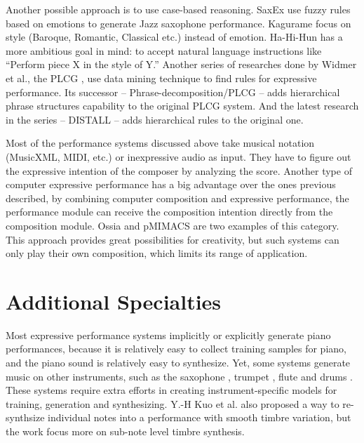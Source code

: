Another possible approach is to use case-based reasoning. SaxEx \cite{40,41,42} use fuzzy rules based on emotions to generate Jazz saxophone performance. Kagurame \cite{43,44} focus on style (Baroque, Romantic, Classical etc.) instead of emotion. Ha-Hi-Hun \cite{45} has a more ambitious goal in mind: to accept natural language instructions like \enquote{Perform piece X in the style of Y.} Another series of researches done by Widmer et al., the PLCG \cite{46, 47, 48}, use data mining technique to find rules for expressive performance. Its successor -- Phrase-decomposition/PLCG \cite{49} -- adds hierarchical phrase structures capability to the original PLCG system. And the latest research in the series -- DISTALL \cite{50, 51} -- adds hierarchical rules to the original one.

Most of the performance systems discussed above take musical notation (MusicXML, MIDI, etc.) or inexpressive audio as input. They have to figure out the expressive intention of the composer by analyzing the score. Another type of computer expressive performance has a big advantage over the ones previous described, by combining computer composition and expressive performance, the performance module can receive the composition intention directly from the composition module. Ossia \cite{61} and pMIMACS \cite{pmimacs} are two examples of this category. This approach provides great possibilities for creativity, but such systems can only play their own composition, which limits its range of application.

\section{Additional Specialties}

Most expressive performance systems implicitly or explicitly generate piano performances, because it is relatively easy to collect training samples for piano, and the piano sound is relatively easy to synthesize. Yet, some systems generate music on other instruments, such as the saxophone \cite{40, 41, 42}, trumpet \cite{24, 25}, flute \cite{39} and drums \cite{56}. These systems require extra efforts in creating instrument-specific models for training, generation and synthesizing. Y.-H Kuo et al. \cite{profsu} also proposed a way to re-synthsize individual notes into a performance with smooth timbre variation, but the work focus more on sub-note level timbre synthesis.



